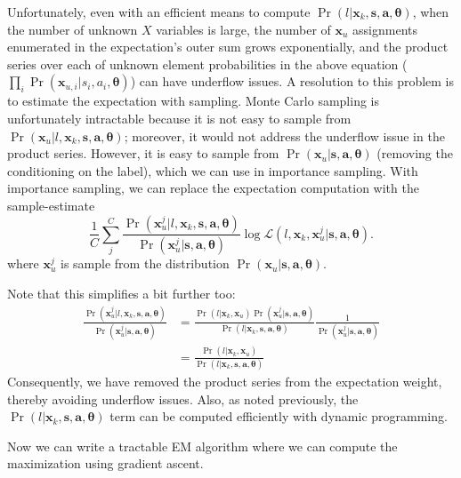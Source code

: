 \documentclass{article}
\begin{document}
Unfortunately, even with an efficient means to compute $\Pr(l | \bm{x}_k, \bm{s}, \bm{a}, \bm{\theta})$, when the number of unknown $X$ variables is large, the number of $\bm{x}_u$ assignments enumerated in the expectation's outer sum grows exponentially, and the product series over each of unknown element probabilities in the above equation ($\prod_i \Pr(\bm{x}_{u,i} | s_i, a_i, \bm{\theta})$) can have underflow issues. A resolution to this problem is to estimate the expectation with sampling. Monte Carlo sampling is unfortunately intractable because it is not easy to sample from $\Pr(\bm{x}_u | l, \bm{x}_k, \bm{s}, \bm{a}, \bm{\theta})$; moreover, it would not address the underflow issue in the product series. However, it is easy to sample from $\Pr(\bm{x}_u | \bm{s}, \bm{a}, \bm{\theta})$ (removing the conditioning on the label), which we can use in importance sampling. With importance sampling, we can replace the expectation computation with the sample-estimate
\begin{equation}
\frac{1}{C} \sum_j^C \frac{\Pr(\bm{x}_u^j | l, \bm{x}_k, \bm{s}, \bm{a}, \bm{\theta})}{\Pr(\bm{x}_u^j | \bm{s}, \bm{a}, \bm{\theta})} \log\mathcal{L}(l, \bm{x}_k, \bm{x}_u^j | \bm{s}, \bm{a}, \bm{\theta}).
\end{equation}
where $\bm{x}_u^j$ is sample from the distribution $\Pr(\bm{x}_u | \bm{s}, \bm{a}, \bm{\theta})$.

Note that this simplifies a bit further too:
\begin{align*}
\frac{\Pr(\bm{x}_u^j | l, \bm{x}_k, \bm{s}, \bm{a}, \bm{\theta})}{\Pr(\bm{x}_u^j | \bm{s}, \bm{a}, \bm{\theta})} &= \frac{\Pr(l | \bm{x}_k, \bm{x}_u) \Pr(\bm{x}_u^j | \bm{s}, \bm{a}, \bm{\theta}) }{\Pr(l | \bm{x}_k, \bm{s}, \bm{a}, \bm{\theta})} \frac{1}{\Pr(\bm{x}_u^j | \bm{s}, \bm{a}, \bm{\theta})} \\
&= \frac{\Pr(l | \bm{x}_k, \bm{x}_u)}{\Pr(l | \bm{x}_k, \bm{s}, \bm{a}, \bm{\theta})}
\end{align*}
Consequently, we have removed the product series from the expectation weight, thereby avoiding underflow issues. Also, as noted previously, the $\Pr(l | \bm{x}_k, \bm{s}, \bm{a}, \bm{\theta})$ term can be computed efficiently with dynamic programming.

Now we can write a tractable EM algorithm where we can compute the maximization using gradient ascent.
\end{document}
